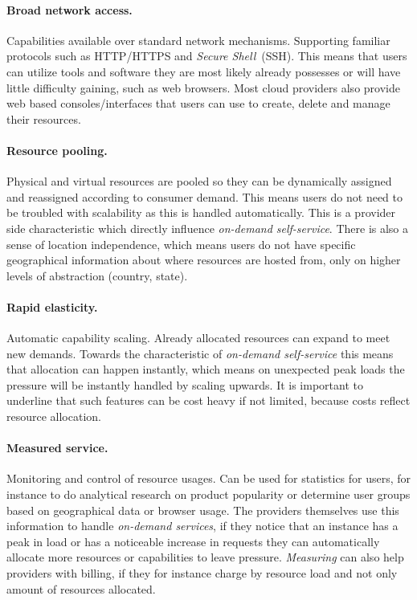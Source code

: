 \paragraph{Broad network access.}

Capabilities available over standard network mechanisms.
Supporting familiar protocols such as HTTP/HTTPS and \emph{Secure Shell}~(SSH).
This means that users can utilize tools and software they are most likely already possesses
or will have little difficulty gaining, such as web browsers.
Most cloud providers also provide web based consoles/interfaces that users can use
to create, delete and manage their resources.

\paragraph{Resource pooling.}

Physical and virtual resources are pooled so they can be 
dynamically assigned and reassigned according to consumer demand.
This means users do not need to be troubled with scalability as this is handled automatically.
This is a provider side characteristic which directly influence \emph{on-demand self-service}.
There is also a sense of location independence, which means users do not have specific geographical
information about where resources are hosted from, only on higher levels of abstraction (country, state).

\paragraph{Rapid elasticity.}

Automatic capability scaling.
Already allocated resources can expand to meet new demands.
Towards the characteristic of \emph{on-demand self-service} this means that allocation
can happen instantly, which means on unexpected peak loads the pressure will be
instantly handled by scaling upwards.
It is important to underline that such features can be cost heavy if not limited,
because costs reflect resource allocation.
\paragraph{Measured service.}

Monitoring and control of resource usages.
Can be used for statistics for users, for instance to do analytical research on product popularity
or determine user groups based on geographical data or browser usage.
The providers themselves use this information to handle \emph{on-demand services},
if they notice that an instance has a peak in load or has a noticeable increase 
in requests they can automatically allocate more resources or capabilities 
to leave pressure.
\emph{Measuring} can also help providers with billing, if they for instance
charge by resource load and not only amount of resources allocated.

